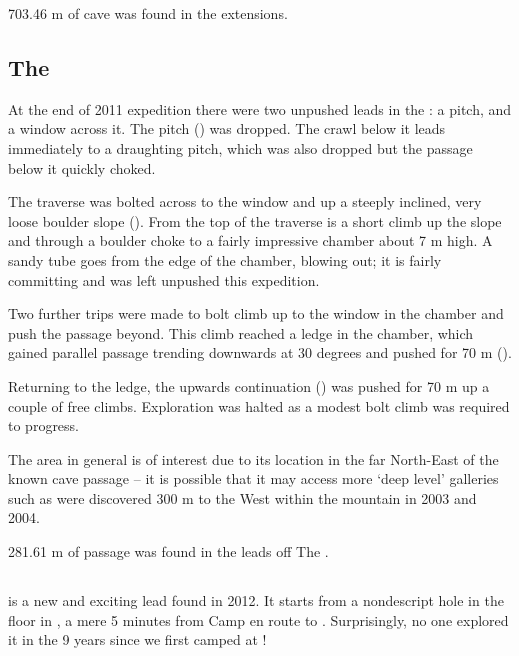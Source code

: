 703.46 m of cave was found in the  extensions.


\subsection{The }

At the end of 2011 expedition there were two unpushed leads in the
: a pitch, and a window across it. The pitch () was dropped. The crawl below it leads immediately to a draughting
pitch, which was also dropped but the passage below it quickly choked.

The traverse was bolted across to the window and up a steeply inclined,
very loose boulder slope (). From the top of the traverse is a
short climb up the slope and through a boulder choke to a fairly
impressive chamber about 7 m high. A sandy tube goes from the edge of
the chamber, blowing out; it is fairly committing and was left unpushed
this expedition.

Two further trips were made to bolt climb up to the window in the
chamber and push the passage beyond. This climb reached a ledge in the
chamber, which gained parallel passage trending downwards at 30 degrees
and pushed for 70 m ().

Returning to the ledge, the upwards continuation ()
was pushed for 70 m up a couple of free climbs. Exploration was halted
as a modest bolt climb was required to progress.

The area in general is of interest due to its location in the far
North-East of the known cave passage -- it is possible that it may access
more `deep level' galleries such as were discovered 300 m to the West
within the mountain in 2003 and 2004.

281.61 m of passage was found in the leads off The .


\subsection{}

 is a new and exciting lead found in 2012. It starts from a
nondescript hole in the floor in , a mere 5
minutes from Camp  en route to . Surprisingly, no one explored it in the 9 years since we
first camped at !

